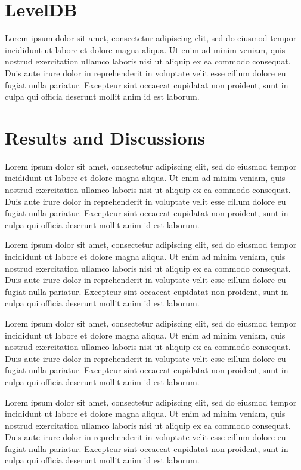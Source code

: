 \documentclass{acm_proc_article-sp}
\begin{document}
\section*{LevelDB}
Lorem ipsum dolor sit amet, consectetur adipiscing elit, sed do eiusmod tempor incididunt ut labore et dolore magna aliqua. Ut enim ad minim veniam, quis nostrud exercitation ullamco laboris nisi ut aliquip ex ea commodo consequat. Duis aute irure dolor in reprehenderit in voluptate velit esse cillum dolore eu fugiat nulla pariatur. Excepteur sint occaecat cupidatat non proident, sunt in culpa qui officia deserunt mollit anim id est laborum.

\section*{Results and Discussions}
Lorem ipsum dolor sit amet, consectetur adipiscing elit, sed do eiusmod tempor incididunt ut labore et dolore magna aliqua. Ut enim ad minim veniam, quis nostrud exercitation ullamco laboris nisi ut aliquip ex ea commodo consequat. Duis aute irure dolor in reprehenderit in voluptate velit esse cillum dolore eu fugiat nulla pariatur. Excepteur sint occaecat cupidatat non proident, sunt in culpa qui officia deserunt mollit anim id est laborum.

Lorem ipsum dolor sit amet, consectetur adipiscing elit, sed do eiusmod tempor incididunt ut labore et dolore magna aliqua. Ut enim ad minim veniam, quis nostrud exercitation ullamco laboris nisi ut aliquip ex ea commodo consequat. Duis aute irure dolor in reprehenderit in voluptate velit esse cillum dolore eu fugiat nulla pariatur. Excepteur sint occaecat cupidatat non proident, sunt in culpa qui officia deserunt mollit anim id est laborum.

Lorem ipsum dolor sit amet, consectetur adipiscing elit, sed do eiusmod tempor incididunt ut labore et dolore magna aliqua. Ut enim ad minim veniam, quis nostrud exercitation ullamco laboris nisi ut aliquip ex ea commodo consequat. Duis aute irure dolor in reprehenderit in voluptate velit esse cillum dolore eu fugiat nulla pariatur. Excepteur sint occaecat cupidatat non proident, sunt in culpa qui officia deserunt mollit anim id est laborum.

Lorem ipsum dolor sit amet, consectetur adipiscing elit, sed do eiusmod tempor incididunt ut labore et dolore magna aliqua. Ut enim ad minim veniam, quis nostrud exercitation ullamco laboris nisi ut aliquip ex ea commodo consequat. Duis aute irure dolor in reprehenderit in voluptate velit esse cillum dolore eu fugiat nulla pariatur. Excepteur sint occaecat cupidatat non proident, sunt in culpa qui officia deserunt mollit anim id est laborum.
\end{document}

